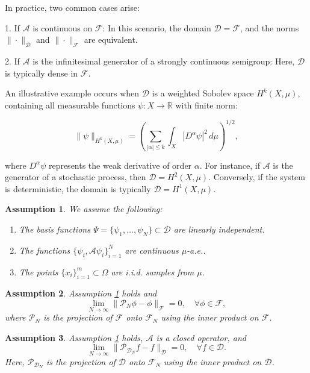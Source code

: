 \documentclass{article}[11]
\newtheorem{assumption}{Assumption}
\begin{document}
In practice, two common cases arise:

1. If \( \mathcal{A} \) is continuous on \( \mathcal{F} \): In this scenario, the domain \( \mathcal{D} = \mathcal{F} \), and the norms \( \| \cdot \|_\mathcal{D} \) and \( \| \cdot \|_{\mathcal{F}} \) are equivalent.

2. If \( \mathcal{A} \) is the infinitesimal generator of a strongly continuous semigroup: Here, \( \mathcal{D} \) is typically dense in \( \mathcal{F} \).

An illustrative example occurs when \( \mathcal{D} \) is a weighted Sobolev space \( H^k(X, \mu) \), containing all measurable functions \( \psi: X \to \mathbb{R} \) with finite norm:

\[
\| \psi \|_{H^k(X, \mu)} = \left( \sum_{|\alpha| \leq k} \int_X |D^\alpha \psi|^2 \, d\mu \right)^{1/2},
\]

where \( D^\alpha \psi \) represents the weak derivative of order \( \alpha \). For instance, if \( \mathcal{A} \) is the generator of a stochastic process, then \( \mathcal{D} = H^2(X, \mu) \). Conversely, if the system is deterministic, the domain is typically \( \mathcal{D} = H^1(X, \mu) \).




\begin{assumption}\label{assumption_1}
	We assume the following:
	\begin{enumerate}
		\item The basis functions $\Psi = \{ \psi_1, \dots, \psi_N \} \subset \mathcal{D}$ are linearly independent.
		\item The functions $\{ \psi_i, \mathcal{A} \psi_i \}_{i=1}^N$ are continuous $\mu$-a.e..
		\item The points $\{ x_i \}_{i=1}^m \subset \Omega$ are i.i.d. samples from $\mu$.
	\end{enumerate}
\end{assumption}

\begin{assumption}\label{assumption_2}
	Assumption \ref{assumption_1} holds and
	\[
	\lim_{N \to \infty} \| \mathcal{P}_N \phi - \phi \|_{\mathcal{F}} = 0, \quad \forall \phi \in \mathcal{F},
	\]
	where $\mathcal{P}_N$ is the projection of $\mathcal{F}$ onto $\mathcal{F}_N$ using the inner product on $\mathcal{F}$.	
\end{assumption}

\begin{assumption}\label{assumption_3}
	Assumption \ref{assumption_1} holds, $\mathcal{A}$ is a closed operator, and
	\[
	\lim_{N \to \infty} \| \mathcal{P}_{\mathcal{D}_N} f - f \|_{\mathcal{D}} = 0, \quad \forall f \in \mathcal{D}.
	\]
	Here, $\mathcal{P}_{\mathcal{D}_N}$ is the projection of $\mathcal{D}$ onto $\mathcal{F}_N$ using the inner product on $\mathcal{D}$.
\end{assumption}
\end{document}
